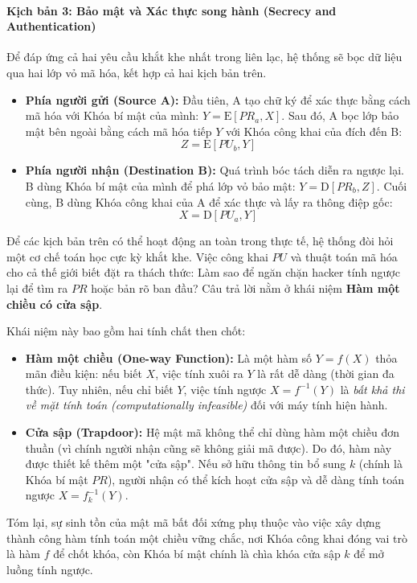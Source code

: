 \paragraph*{Kịch bản 3: Bảo mật và Xác thực song hành (Secrecy and Authentication)}
Để đáp ứng cả hai yêu cầu khắt khe nhất trong liên lạc, hệ thống sẽ bọc dữ liệu qua hai lớp vỏ mã hóa, kết hợp cả hai kịch bản trên.
\begin{itemize}
    \item \textbf{Phía người gửi (Source A):} Đầu tiên, A tạo chữ ký để xác thực bằng cách mã hóa với Khóa bí mật của mình: $Y = \mathrm{E}[PR_a, X]$. Sau đó, A bọc lớp bảo mật bên ngoài bằng cách mã hóa tiếp $Y$ với Khóa công khai của đích đến B:
    $$Z = \mathrm{E}[PU_b, Y]$$
    \item \textbf{Phía người nhận (Destination B):} Quá trình bóc tách diễn ra ngược lại. B dùng Khóa bí mật của mình để phá lớp vỏ bảo mật: $Y = \mathrm{D}[PR_b, Z]$. Cuối cùng, B dùng Khóa công khai của A để xác thực và lấy ra thông điệp gốc:
    $$X = \mathrm{D}[PU_a, Y]$$
\end{itemize}

Để các kịch bản trên có thể hoạt động an toàn trong thực tế, hệ thống đòi hỏi một cơ chế toán học cực kỳ khắt khe. Việc công khai $PU$ và thuật toán mã hóa cho cả thế giới biết đặt ra thách thức: Làm sao để ngăn chặn hacker tính ngược lại để tìm ra $PR$ hoặc bản rõ ban đầu? Câu trả lời nằm ở khái niệm \textbf{Hàm một chiều có cửa sập}.

Khái niệm này bao gồm hai tính chất then chốt:
\begin{itemize}
    \item \textbf{Hàm một chiều (One-way Function):} Là một hàm số $Y = f(X)$ thỏa mãn điều kiện: nếu biết $X$, việc tính xuôi ra $Y$ là rất dễ dàng (thời gian đa thức). Tuy nhiên, nếu chỉ biết $Y$, việc tính ngược $X = f^{-1}(Y)$ là \textit{bất khả thi về mặt tính toán (computationally infeasible)} đối với máy tính hiện hành.
    \item \textbf{Cửa sập (Trapdoor):} Hệ mật mã không thể chỉ dùng hàm một chiều đơn thuần (vì chính người nhận cũng sẽ không giải mã được). Do đó, hàm này được thiết kế thêm một "cửa sập". Nếu sở hữu thông tin bổ sung $k$ (chính là Khóa bí mật $PR$), người nhận có thể kích hoạt cửa sập và dễ dàng tính toán ngược $X = f_k^{-1}(Y)$.
\end{itemize}

Tóm lại, sự sinh tồn của mật mã bất đối xứng phụ thuộc vào việc xây dựng thành công hàm tính toán một chiều vững chắc, nơi Khóa công khai đóng vai trò là hàm $f$ để chốt khóa, còn Khóa bí mật chính là chìa khóa cửa sập $k$ để mở luồng tính ngược.

